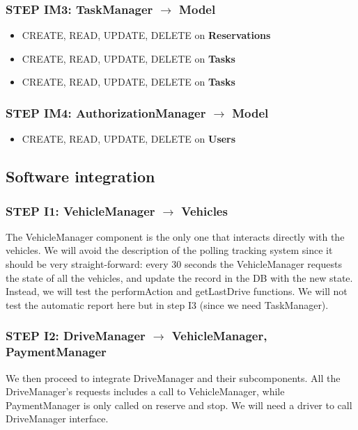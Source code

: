 \subsubsection{STEP IM3: TaskManager $\rightarrow$ Model}
\begin{itemize}
	\item CREATE, READ, UPDATE, DELETE on \textbf{Reservations}
	\item CREATE, READ, UPDATE, DELETE on \textbf{Tasks}
	\item CREATE, READ, UPDATE, DELETE on \textbf{Tasks}
\end{itemize}

\subsubsection{STEP IM4: AuthorizationManager $\rightarrow$ Model}
\begin{itemize}
	\item CREATE, READ, UPDATE, DELETE on \textbf{Users}
\end{itemize}

\subsection{Software integration}

\subsubsection{STEP I1: VehicleManager $\rightarrow$ Vehicles}
The VehicleManager component is the only one that interacts directly with the vehicles. We will avoid the description of the polling tracking system since it should be very straight-forward: every 30 seconds the VehicleManager requests the state of all the vehicles, and update the record in the DB with the new state. Instead, we will test the performAction and getLastDrive functions. We will not test the automatic report here but in step I3 (since we need TaskManager).

\subsubsection{STEP I2: DriveManager $\rightarrow$ VehicleManager, PaymentManager}
We then proceed to integrate DriveManager and their subcomponents. All the DriveManager's requests includes a call to VehicleManager, while PaymentManager is only called on reserve and stop. We will need a driver to call DriveManager interface.

